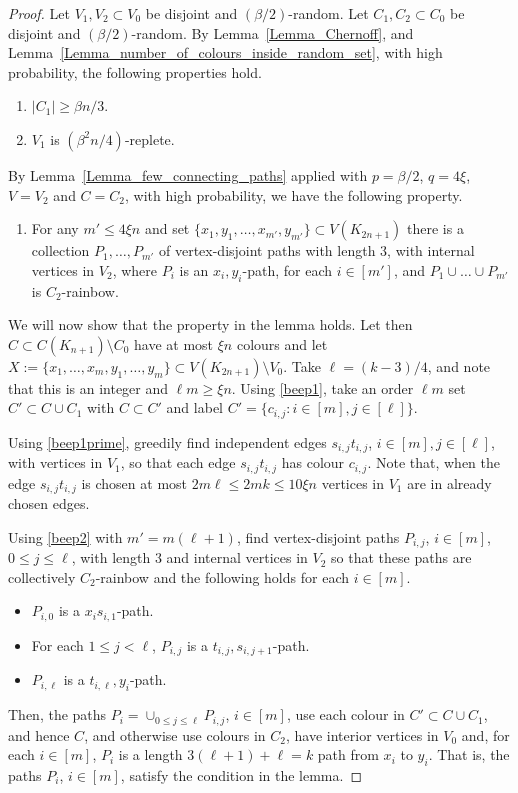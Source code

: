 \begin{proof} Let $V_1,V_2\subset V_0$ be disjoint and $(\beta/2)$-random. Let $C_1,C_2\subset C_0$ be disjoint and $(\beta/2)$-random.
By Lemma~\ref{Lemma_Chernoff}, and Lemma~\ref{Lemma_number_of_colours_inside_random_set}, with high probability, the following properties hold.
\begin{enumerate}[label = {\bfseries \Alph{propcounter}\arabic{enumi}}]
\item $|C_1|\geq \beta n/3$.\label{beep1}
\item $V_1$ is $(\beta^2 n/4)$-replete. \label{beep1prime}
\end{enumerate}
By Lemma~\ref{Lemma_few_connecting_paths} applied with $p=\beta /2$, $q=4\xi$, $V=V_2$ and $C=C_2$, with high probability, we have the following property.
\begin{enumerate}[label = {\bfseries \Alph{propcounter}\arabic{enumi}}]\addtocounter{enumi}{2}
 \item For any $m'\leq 4\xi n$ and set $\{x_1, y_1, \dots, x_{m'}, y_{m'}\}\subset V(K_{2n+1})$
 there is a collection $P_1, \dots, P_{m'}$ of vertex-disjoint paths with length $3$, with internal vertices in $V_2$, where $P_i$ is an $x_i,y_i$-path, for each $i\in [m']$, and $P_1\cup \dots\cup P_{m'}$ is $C_2$-rainbow.\label{beep2}
\end{enumerate}

We will now show that the property in the lemma holds. Let then $C\subset C(K_{n+1})\setminus C_0$ have at most $\xi n$ colours and let $X:=\{x_1,\ldots,x_m,y_1,\ldots,y_m\}\subset V(K_{2n+1})\setminus V_0$. Take $\ell=(k-3)/4$, and note that this is an integer and $\ell m\geq \xi n$. Using \ref{beep1}, take an order $\ell m$ set $C'\subset C\cup C_1$ with $C\subset C'$  and label $C'=\{c_{i,j}:i\in [m],j\in [\ell]\}$.

Using \ref{beep1prime}, greedily find independent edges $s_{i,j}t_{i,j}$, $i\in [m],j\in [\ell]$, with vertices in $V_1$, so that each edge  $s_{i,j}t_{i,j}$ has colour $c_{i,j}$. Note that, when the edge $s_{i,j}t_{i,j}$ is chosen at most $2m\ell\leq 2mk\leq 10\xi n$ vertices in $V_1$ are in already chosen edges. 

Using \ref{beep2}  with $m'=m(\ell+1)$, find vertex-disjoint paths $P_{i,j}$, $i\in [m]$, $0\leq j\leq \ell$, with length 3 and internal vertices in $V_2$ so that these paths are collectively $C_2$-rainbow and the following holds for each $i\in [m]$.
\begin{itemize}
\item $P_{i,0}$ is a $x_{i}s_{i,1}$-path.
\item For each $1\leq j<\ell$, $P_{i,j}$ is a $t_{i,j},s_{i,j+1}$-path.
\item $P_{i,\ell}$ is a $t_{i,\ell},y_i$-path.
\end{itemize}
Then, the paths $P_i=\cup_{0\leq j\leq \ell}P_{i,j}$, $i\in [m]$, use each colour in $C'\subset C\cup C_1$, and hence $C$, and otherwise use colours in $C_2$, have interior vertices in $V_0$ and, for each $i\in [m]$, $P_i$ is a length $3(\ell+1)+\ell=k$ path from $x_i$ to $y_i$. That is, the paths $P_i$, $i\in[m]$, satisfy the condition in the lemma. \end{proof}
